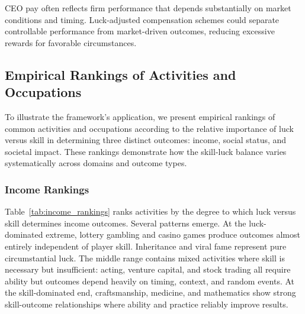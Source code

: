   CEO pay often reflects firm performance that depends substantially on
  market conditions and timing. Luck-adjusted compensation schemes could
  separate controllable performance from market-driven outcomes,
  reducing excessive rewards for favorable circumstances.

  \subsection{Empirical Rankings of Activities and Occupations}

  To illustrate the framework's application, we present empirical rankings
  of common activities and occupations according to the relative importance
  of luck versus skill in determining three distinct outcomes: income,
  social status, and societal impact. These rankings demonstrate how
  the skill-luck balance varies systematically across domains and outcome
  types.

  \subsubsection{Income Rankings}

  Table~\ref{tab:income_rankings} ranks activities by the degree to which
  luck versus skill determines income outcomes. Several patterns emerge.
  At the luck-dominated extreme, lottery gambling and casino games produce
  outcomes almost entirely independent of player skill. Inheritance and
  viral fame represent pure circumstantial luck. The middle range contains
  mixed activities where skill is necessary but insufficient: acting,
  venture capital, and stock trading all require ability but outcomes
  depend heavily on timing, context, and random events. At the skill-dominated
  end, craftsmanship, medicine, and mathematics show strong skill-outcome
  relationships where ability and practice reliably improve results.

